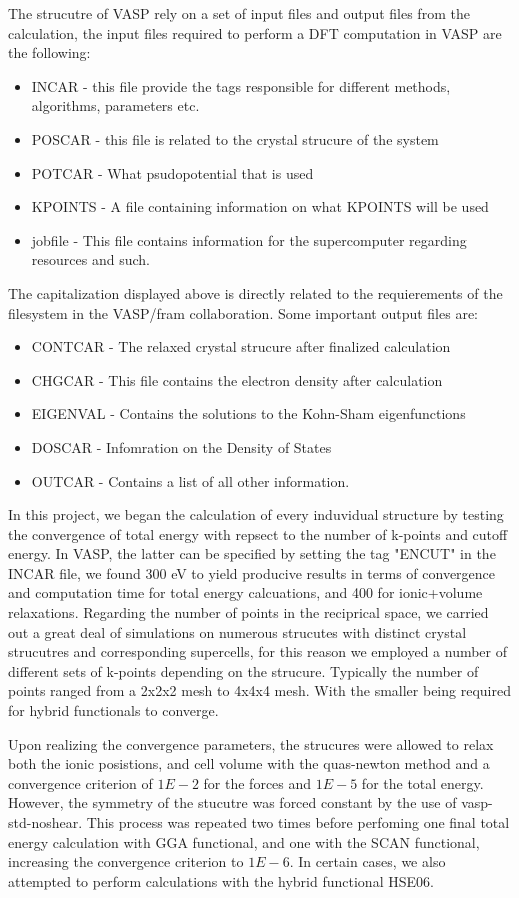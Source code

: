 The strucutre of VASP rely on a set of input files and output files from the calculation, the input files required to perform a DFT computation in VASP are the following:
\begin{itemize}
    \item INCAR - this file provide the tags responsible for different methods, algorithms, parameters etc.
    \item POSCAR - this file is related to the crystal strucure of the system
    \item POTCAR - What psudopotential that is used
    \item KPOINTS - A file containing information on what KPOINTS will be used
    \item jobfile - This file contains information for the supercomputer regarding resources and such.
\end{itemize}
The capitalization displayed above is directly related to the requierements of the filesystem in the VASP/fram collaboration. Some important output files are:
\begin{itemize}
    \item CONTCAR - The relaxed crystal strucure after finalized calculation
    \item CHGCAR - This file contains the electron density after calculation
    \item EIGENVAL - Contains the solutions to the Kohn-Sham eigenfunctions
    \item DOSCAR - Infomration on the Density of States
    \item OUTCAR - Contains a list of all other information.
\end{itemize}
In this project, we began the calculation of every induvidual structure by testing the convergence of total energy with repsect to the number of k-points and cutoff energy. In VASP, the latter can be specified by setting the tag "ENCUT" in the INCAR file, we found 300 eV to yield producive results in terms of convergence and computation time for total energy calcuations, and 400 for ionic+volume relaxations. Regarding the number of points in the reciprical space, we carried out a great deal of simulations on numerous strucutes with distinct crystal strucutres and corresponding supercells, for this reason we employed a number of different sets of k-points depending on the strucure. Typically the number of points ranged from a 2x2x2 mesh to 4x4x4 mesh. With the smaller being required for hybrid functionals to converge. 

Upon realizing the convergence parameters, the strucures were allowed to relax both the ionic posistions, and cell volume with the quas-newton method and a convergence criterion of $1E-2$ for the forces and $1E-5$ for the total energy. However, the symmetry of the stucutre was forced constant by the use of vasp-std-noshear. This process was repeated two times before perfoming one final total energy calculation with GGA functional, and one with the SCAN functional, increasing the convergence criterion to $1E-6$. In certain cases, we also attempted to perform calculations with the hybrid functional HSE06.


